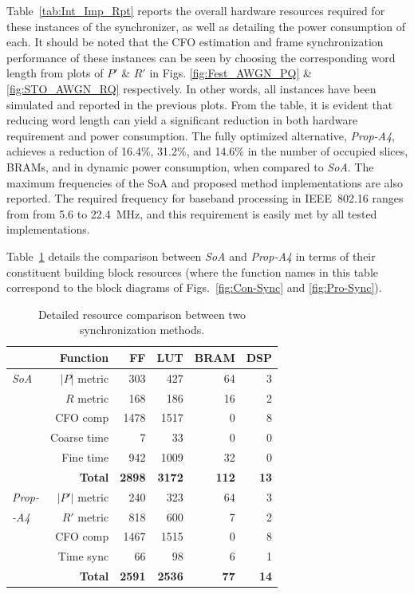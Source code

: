 Table~\ref{tab:Int_Imp_Rpt} reports the overall hardware resources required for these instances of the synchronizer, as well as detailing the power consumption of each.
It should be noted that the CFO estimation and frame synchronization performance of these instances can be seen by choosing the corresponding word length from plots of $P'$ \& $R'$ in Figs. \ref{fig:Fest_AWGN_PQ} \& \ref{fig:STO_AWGN_RQ} respectively. In other words, all instances have been simulated and reported in the previous plots.
From the table, it is evident that reducing word length can yield a significant reduction in both hardware requirement and power consumption.
The fully optimized alternative, \textit{Prop-A4}, achieves a reduction of 16.4\%, 31.2\%, and 14.6\% in the number of occupied slices, BRAMs, and in dynamic power consumption, when compared to \textit{SoA}.
The maximum frequencies of the SoA and proposed method implementations are also reported. 
The required frequency for baseband processing in IEEE~802.16 ranges from from 5.6 to 22.4~MHz, and this requirement is easily met by all tested implementations.

Table~\ref{tab:Imp_Rpt} details the comparison between \textit{SoA} and \textit{Prop-A4} in terms of their constituent building block resources (where the function names in this table correspond to the block diagrams of Figs.~\ref{fig:Con-Sync} and \ref{fig:Pro-Sync}).

\begin{table}[h]
	\centering
	\caption{ Detailed resource comparison between two synchronization methods.}
	\label{tab:Imp_Rpt}
	\begin{tabular}{l|r|r|r|r|r}
       \hline \hline
    		  \multicolumn{2}{r|}{Function}			& {FF} & {LUT} & {BRAM} & {DSP} \\
    	\hline
		\textit{SoA}		&  $|P|$ metric		& 303 	& 427 	& 64 	& 3 	\\
						&  $R$ metric		& 168 	& 186 	& 16 	& 2	\\
						&  CFO comp		& 1478 	& 1517 	& 0	 	& 8	\\
						& Coarse time		& 7  	& 33  	& 0	 	& 0	\\
    						& Fine time			& 942  	& 1009  	& 32 	& 0	\\
						& \textbf{Total} & \textbf{2898} & \textbf{3172} & \textbf{112} & \textbf{13}\\
	\hline
		\textit{Prop-}		& $|P'|$ metric		& 240 	& 323 	& 64 	& 3 \\
		\textit{-A4}				& $R'$ metric		& 818 	& 600 	& 7		& 2 \\
						& CFO comp		& 1467 	& 1515 	& 0 		& 8 \\
						& Time sync			& 66	& 98	& 6 		& 1 \\
						& \textbf{Total} & \textbf{2591} & \textbf{2536} & \textbf{77} & \textbf{14}\\
    	\hline \hline
    \end{tabular}
\end{table}

